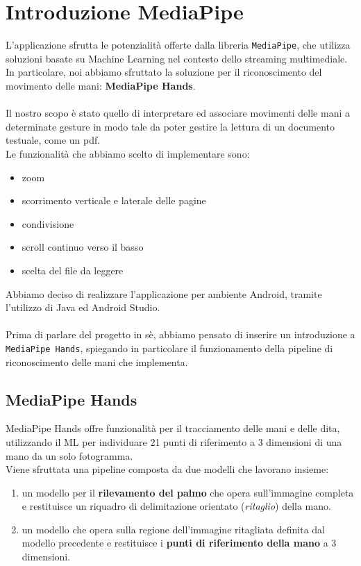 \chapter{Introduzione MediaPipe}

L'applicazione sfrutta le potenzialità offerte dalla libreria \texttt{MediaPipe}, che utilizza soluzioni basate su Machine Learning nel contesto dello streaming multimediale. 
In particolare, noi abbiamo sfruttato la soluzione per il riconoscimento del movimento delle mani: \textbf{MediaPipe Hands}.\\
\\
\noindent Il nostro scopo è stato quello di interpretare ed associare movimenti delle mani a determinate gesture in modo tale da poter gestire la lettura di un documento testuale, come un pdf.\\Le funzionalità che abbiamo scelto di implementare sono:
\begin{itemize}
    \item zoom
    \item scorrimento verticale e laterale delle pagine
    \item condivisione
    \item scroll continuo verso il basso
    \item scelta del file da leggere
\end{itemize}
\noindent Abbiamo deciso di realizzare l'applicazione per ambiente Android, tramite l'utilizzo di Java ed Android Studio.\\
\\
\noindent Prima di parlare del progetto in sè, abbiamo pensato di inserire un introduzione a \texttt{MediaPipe Hands}, 
spiegando in particolare il funzionamento della pipeline di riconoscimento delle mani che implementa.

\newpage
\section{MediaPipe Hands}

MediaPipe Hands offre funzionalità per il tracciamento delle mani e delle dita, utilizzando il ML per individuare 21 punti di riferimento a 3 dimensioni di una mano da un solo fotogramma.\\
Viene sfruttata una pipeline composta da due modelli che lavorano insieme:
\begin{enumerate}
    \item un modello per il \textbf{rilevamento del palmo} che opera sull'immagine completa e restituisce un riquadro di delimitazione orientato (\textit{ritaglio}) della mano. 
    \item un modello che opera sulla regione dell'immagine ritagliata definita dal modello precedente e restituisce i \textbf{punti di riferimento della mano} a 3 dimensioni.
\end{enumerate}

